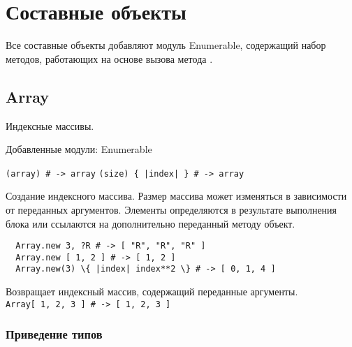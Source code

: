 \chapter{Составные объекты}

Все составные объекты добавляют модуль Enumerable, содержащий набор методов, работающих на основе вызова метода .

\section{Array}

Индексные массивы.

Добавленные модули: Enumerable 

\begin{methodlist}
  \verb!(array) # -> array!
  \verb!(size) { |index| } # -> array!

  Создание индексного массива. Размер массива может изменяться в зависимости от переданных аргументов. Элементы определяются в результате выполнения блока или ссылаются на дополнительно переданный методу объект.
  \begin{verbatim}
  Array.new 3, ?R # -> [ "R", "R", "R" ]
  Array.new [ 1, 2 ] # -> [ 1, 2 ]
  Array.new(3) \{ |index| index**2 \} # -> [ 0, 1, 4 ]
  \end{verbatim}

  Возвращает индексный массив, содержащий переданные аргументы. 
  \\\verb!Array[ 1, 2, 3 ] # -> [ 1, 2, 3 ]!
\end{methodlist}

\subsection*{Приведение типов} 

